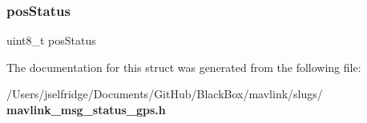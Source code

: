 \mbox{\label{struct____mavlink__status__gps__t_af7c8698471d6bfdc89bf386373b3d6e5}} 
\subsubsection{pos\+Status}
{\footnotesize\ttfamily uint8\+\_\+t pos\+Status}



The documentation for this struct was generated from the following file\+:\begin{DoxyCompactItemize}
\item 
/\+Users/jselfridge/\+Documents/\+Git\+Hub/\+Black\+Box/mavlink/slugs/\textbf{ mavlink\+\_\+msg\+\_\+status\+\_\+gps.\+h}\end{DoxyCompactItemize}
